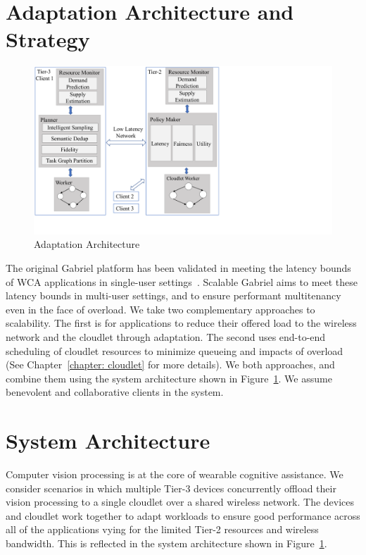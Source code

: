 \section{Adaptation Architecture and Strategy}

\begin{figure}[h]
\centering
\includegraphics[width=\textwidth,trim=0 3em 11cm 0, clip]{FIGS/arch-vertical.pdf}
\vspace{-0.3in}
\caption{Adaptation Architecture}
\label{fig:arch}
\end{figure}

The original Gabriel platform has been validated in meeting the latency bounds
of WCA applications in single-user settings~\cite{chen2017empirical}.  Scalable
Gabriel aims to meet these latency bounds in multi-user settings, and to ensure
performant multitenancy even in the face of overload.  We take two complementary
approaches to scalability.  The first is for applications to reduce their
offered load to the wireless network and the cloudlet through adaptation.  The
second uses end-to-end scheduling of cloudlet resources to minimize queueing and
impacts of overload (See Chapter~\ref{chapter: cloudlet} for more details).  We
both approaches, and combine them using the system architecture shown in
Figure~\ref{fig:arch}.  We assume benevolent and collaborative clients in the
system.

\section{System Architecture}

Computer vision processing is at the core of wearable cognitive assistance. We
consider scenarios in which multiple Tier-3 devices concurrently offload their
vision processing to a single cloudlet over a shared wireless network.  The
devices and cloudlet work together to adapt workloads to ensure good performance
across all of the applications vying for the limited Tier-2 resources and
wireless bandwidth.  This is reflected in the system architecture shown in
Figure~\ref{fig:arch}.

